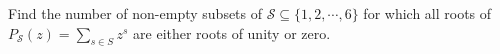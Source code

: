 Find the number of non-empty subsets of $\mathcal{S}\subseteq \{1, 2, \cdots, 6\}$ for which all roots of $P_{\mathcal{S}}(z) = \sum_{s\in S}z^s$ are either roots of unity or zero.
